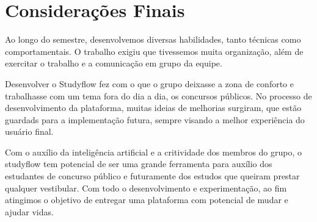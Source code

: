\chapter{Considerações Finais}

Ao longo do semestre, desenvolvemos diversas habilidades, tanto técnicas como comportamentais. O trabalho exigiu que tivessemos muita organização, além de exercitar o trabalho e a comunicação em grupo da equipe.

Desenvolver o Studyflow fez com o que o grupo deixasse a zona de conforto e trabalhasse com um tema fora do dia a dia, os concursos públicos. No processo de desenvolvimento da plataforma, muitas ideias de melhorias surgiram, que estão guardads para a implementação futura, sempre visando a melhor experiência do usuário final.

Com o auxílio da inteligência artificial e a critividade dos membros do grupo, o studyflow tem potencial de ser uma grande ferramenta para auxílio dos estudantes de concurso público e futuramente dos estudos que queiram prestar qualquer vestibular. Com todo o desenvolvimento e experimentação, ao fim atingimos o objetivo de entregar uma plataforma com potencial de mudar e ajudar vidas.